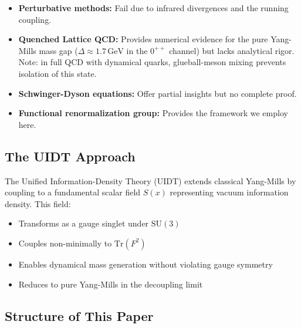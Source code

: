 \documentclass[11pt,a4paper]{article}
\renewcommand{\Tr}{\mathrm{Tr}}
\theoremstyle{plain}
\theoremstyle{definition}
\begin{document}
\begin{itemize}
\item \textbf{Perturbative methods:} Fail due to infrared divergences and the running coupling.
\item \textbf{Quenched Lattice QCD:} Provides numerical evidence for the pure Yang-Mills mass gap ($\Delta \approx 1.7\,\mathrm{GeV}$ in the $0^{++}$ channel) but lacks analytical rigor. Note: in full QCD with dynamical quarks, glueball-meson mixing prevents isolation of this state.
\item \textbf{Schwinger-Dyson equations:} Offer partial insights but no complete proof.
\item \textbf{Functional renormalization group:} Provides the framework we employ here.
\end{itemize}

\subsection{The UIDT Approach}

The Unified Information-Density Theory (UIDT) extends classical Yang-Mills by coupling to a fundamental scalar field $S(x)$ representing vacuum information density. This field:
\begin{itemize}
\item Transforms as a gauge singlet under $\mathrm{SU}(3)$
\item Couples non-minimally to $\Tr(F^2)$
\item Enables dynamical mass generation without violating gauge symmetry
\item Reduces to pure Yang-Mills in the decoupling limit
\end{itemize}

\subsection{Structure of This Paper}
\end{document}
